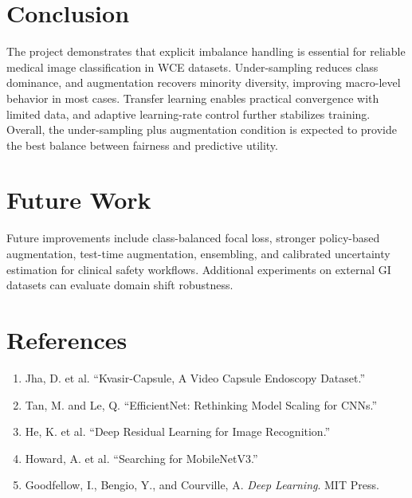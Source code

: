 \documentclass[12pt,a4paper]{article}
\begin{document}
\section{Conclusion}
The project demonstrates that explicit imbalance handling is essential for reliable medical image classification in WCE datasets. Under-sampling reduces class dominance, and augmentation recovers minority diversity, improving macro-level behavior in most cases. Transfer learning enables practical convergence with limited data, and adaptive learning-rate control further stabilizes training. Overall, the under-sampling plus augmentation condition is expected to provide the best balance between fairness and predictive utility.

\section{Future Work}
Future improvements include class-balanced focal loss, stronger policy-based augmentation, test-time augmentation, ensembling, and calibrated uncertainty estimation for clinical safety workflows. Additional experiments on external GI datasets can evaluate domain shift robustness.

\section{References}
\begin{enumerate}
    \item Jha, D. et al. ``Kvasir-Capsule, A Video Capsule Endoscopy Dataset.''
    \item Tan, M. and Le, Q. ``EfficientNet: Rethinking Model Scaling for CNNs.''
    \item He, K. et al. ``Deep Residual Learning for Image Recognition.''
    \item Howard, A. et al. ``Searching for MobileNetV3.''
    \item Goodfellow, I., Bengio, Y., and Courville, A. \textit{Deep Learning}. MIT Press.
\end{enumerate}
\end{document}
